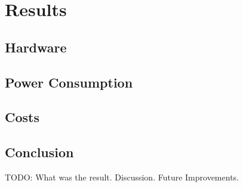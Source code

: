 \chapter{Results}
\section{Hardware}
\section{Power Consumption}
\section{Costs}
\section{Conclusion}

TODO: What was the result. Discussion. Future Improvements.
